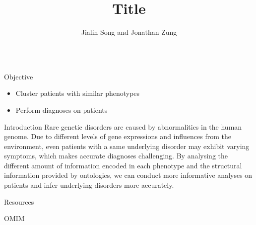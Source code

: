 \documentclass[final]{beamer} %
\title[]{{\fontsize{240}{240}\selectfont Title}}
\author[]{Jialin Song and Jonathan Zung}
\institute[University of Toronto]{Computational Biology Lab, University of Toronto}
\begin{document}
  \begin{frame}{}
  \maketitle
    \begin{columns}[T]
      \begin{column}{0.3\linewidth}

     \begin{block}{\Huge Objective}
     \begin{itemize}
    \Large
     \item
     Cluster patients with similar phenotypes
    \item
    Perform diagnoses on patients
     \end{itemize}
      \end{block}

    \begin{block}{\Huge Introduction}
    \Large
    Rare genetic disorders are caused by abnormalities in the human genome. Due to different levels of gene expressions and influences from the environment, even patients with a same underlying disorder may exhibit varying symptoms, which makes accurate diagnoses challenging. By analysing the different amount of information encoded in each phenotype and the structural information provided by ontologies, we can conduct more informative analyses on patients and infer underlying disorders more accurately. 
   \vspace{1cm} 

    \end{block}
    
    \begin{block}{\Huge Resources}
    
    \begin{block}{\Large OMIM}
      \begin{columns}[T]
        \begin{column}{.5\textwidth}
		\centering
		\vspace{1cm}
        \end{column}
        

\end{columns}
\end{block}
\end{block}
\end{column}
\end{columns}
\end{frame}
\end{document}
